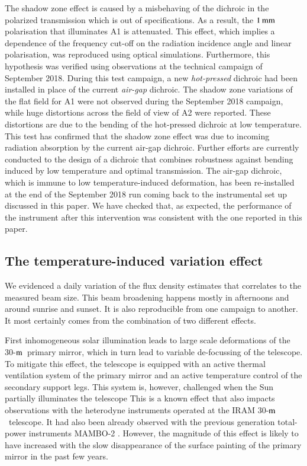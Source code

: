 \documentclass[traditionalabstract]{aa}
\newcommand{\trentemetre}{30-$\rm{m}$}
\newcommand{\lp}[1]{#1}
\begin{document}
The shadow zone effect is caused by {\lp a misbehaving of the dichroic in
the polarized transmission which is out of specifications. As a
result, the $1\,\rm{mm}$ polarisation that illuminates A1 is
attenuated.}
This effect,
which implies {\lp a dependence of the frequency cut-off on the radiation
incidence angle and linear polarisation,}
was reproduced using optical simulations. Furthermore, this hypothesis was
verified using observations at the technical campaign of September
2018. During this test campaign, a new \emph{hot-pressed} dichroic had
been installed in place of the current \emph{air-gap} dichroic.
The shadow zone variations of the flat field for A1 were
not observed during the September 2018 campaign, while huge distortions
across the field of view of A2 were reported. These distortions are
due to the bending of the hot-pressed dichroic at low temperature.
This test has confirmed that the shadow zone effect was due
to incoming radiation absorption by the current air-gap dichroic.
Further efforts are currently conducted to the design of a dichroic that
combines robustness against bending induced by low temperature and
optimal transmission.
{\lp The air-gap dichroic, which is immune to low temperature-induced
deformation, has been re-installed at the end of the September 2018
run coming back to the instrumental set up discussed in this paper. We
have checked that, as expected, the performance of the instrument
after this intervention was consistent with the one reported in this
paper.}


\subsection{The temperature-induced variation effect}
\label{se:beam_variation}

We evidenced a daily variation of the flux density estimates that correlates to the
measured beam size. This beam broadening happens mostly in afternoons and around
sunrise and sunset. It is also reproducible from one campaign to another. It most certainly
comes from the combination of two different effects.

First inhomogeneous solar illumination leads to large scale deformations of the
\trentemetre\ primary mirror, which in turn lead to variable de-focussing of the
telescope. {\lp To mitigate this effect, the telescope is equipped with an
  active thermal ventilation system of the primary mirror and an active
  temperature control of the secondary support legs. This system is, however,
  challenged when the Sun partially illuminates the telescope}
  {\lp This is a known effect that also impacts
  observations with the heterodyne instruments operated at the IRAM
  \trentemetre\ telescope. It had also been already observed with the previous
  generation total-power instruments MAMBO-2 \citep{Kreysa1999}.} However, the
magnitude of this effect is likely to have increased with the slow disappearance
of the surface painting of the primary mirror in the past few years.
\end{document}
